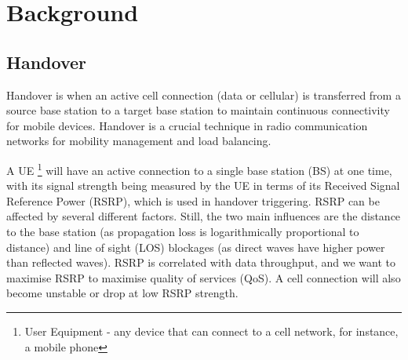 \chapter{Background}
\section{Handover}
Handover is when an active cell connection (data or cellular) is transferred from a source base station to a target base station to maintain continuous connectivity for mobile devices. Handover is a crucial technique in radio communication networks for mobility management and load balancing.

A UE \footnote{User Equipment - any device that can connect to a cell network, for instance, a mobile phone} will have an active connection to a single base station (BS) at one time, with its signal strength being measured by the UE in terms of its Received Signal Reference Power (RSRP), which is used in handover triggering. RSRP can be affected by several different factors. Still, the two main influences are the distance to the base station (as propagation loss is logarithmically proportional to distance) and line of sight (LOS) blockages (as direct waves have higher power than reflected waves). 
RSRP is correlated with data throughput, and we want to maximise RSRP to maximise quality of services (QoS). A cell connection will also become unstable or drop at low RSRP strength.

